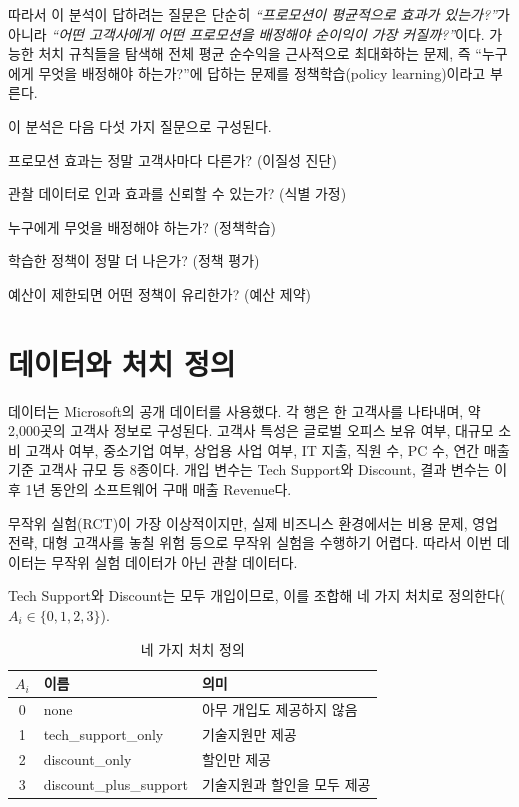 \documentclass[11pt]{article}
\begin{document}
따라서 이 분석이 답하려는 질문은 단순히 \emph{``프로모션이 평균적으로 효과가 있는가?''}가 아니라 \emph{``어떤 고객사에게 어떤 프로모션을 배정해야 순이익이 가장 커질까?''}이다. 가능한 처치 규칙들을 탐색해 전체 평균 순수익을 근사적으로 최대화하는 문제, 즉 ``누구에게 무엇을 배정해야 하는가?''에 답하는 문제를 정책학습(policy learning)이라고 부른다.

이 분석은 다음 다섯 가지 질문으로 구성된다.

\begin{description}[leftmargin=2.4em, itemsep=2pt]
  \item[Q1.] 프로모션 효과는 정말 고객사마다 다른가? (이질성 진단)
  \item[Q2.] 관찰 데이터로 인과 효과를 신뢰할 수 있는가? (식별 가정)
  \item[Q3.] 누구에게 무엇을 배정해야 하는가? (정책학습)
  \item[Q4.] 학습한 정책이 정말 더 나은가? (정책 평가)
  \item[Q5.] 예산이 제한되면 어떤 정책이 유리한가? (예산 제약)
\end{description}

\section{데이터와 처치 정의}

데이터는 Microsoft의 공개 데이터를 사용했다. 각 행은 한 고객사를 나타내며, 약 2{,}000곳의 고객사 정보로 구성된다. 고객사 특성은 글로벌 오피스 보유 여부, 대규모 소비 고객사 여부, 중소기업 여부, 상업용 사업 여부, IT 지출, 직원 수, PC 수, 연간 매출 기준 고객사 규모 등 8종이다. 개입 변수는 Tech Support와 Discount, 결과 변수는 이후 1년 동안의 소프트웨어 구매 매출 Revenue다.

무작위 실험(RCT)이 가장 이상적이지만, 실제 비즈니스 환경에서는 비용 문제, 영업 전략, 대형 고객사를 놓칠 위험 등으로 무작위 실험을 수행하기 어렵다. 따라서 이번 데이터는 무작위 실험 데이터가 아닌 관찰 데이터다.

Tech Support와 Discount는 모두 개입이므로, 이를 조합해 네 가지 처치로 정의한다($A_i \in \{0,1,2,3\}$).

\begin{table}[h]
\centering
\small
\caption{네 가지 처치 정의}
\begin{tabular}{cll}
\toprule
$A_i$ & 이름 & 의미 \\
\midrule
0 & none & 아무 개입도 제공하지 않음 \\
1 & tech\_support\_only & 기술지원만 제공 \\
2 & discount\_only & 할인만 제공 \\
3 & discount\_plus\_support & 기술지원과 할인을 모두 제공 \\
\bottomrule
\end{tabular}
\end{table}
\end{document}
